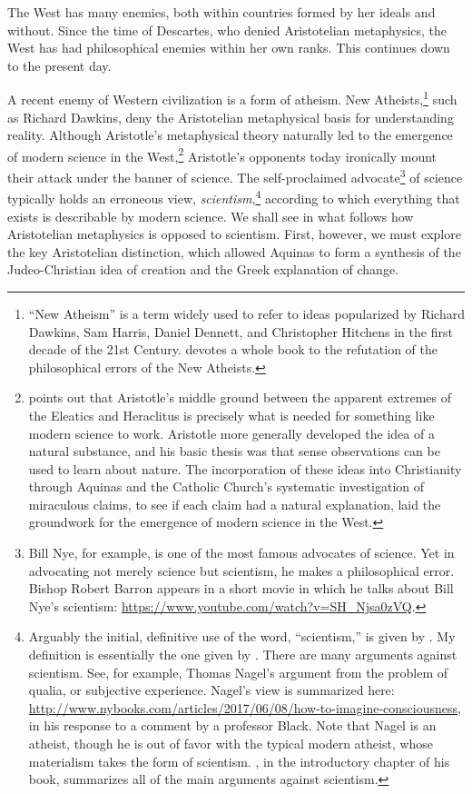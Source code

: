 \documentclass[twocolumn]{article}
\begin{document}
The West has many enemies, both within countries formed by her ideals and
without.  Since the time of Descartes, who denied Aristotelian metaphysics, the
West has had philosophical enemies within her own ranks.  This continues down
to the present day.

A recent enemy of Western civilization is a form of atheism.  New
Atheists,\footnote{%
   ``New Atheism'' is a term widely used to refer to ideas popularized by
   Richard Dawkins, Sam Harris, Daniel Dennett, and Christopher Hitchens in the
   first decade of the 21st Century.  \cite{f2008} devotes a whole book to the
   refutation of the philosophical errors of the New Atheists.
}
such as Richard Dawkins, deny the Aristotelian metaphysical basis for
understanding reality.  Although Aristotle's metaphysical theory naturally led
to the emergence of modern science in the West,\footnote{%
   \citet[Page 36]{f2014} points out that Aristotle's middle ground between the
   apparent extremes of the Eleatics and Heraclitus is precisely what is needed
   for something like modern science to work.  Aristotle more generally
   \citep[Pages 164--171]{f2014} developed the idea of a natural substance, and
   his basic thesis was that sense observations can be used to learn about
   nature.  The incorporation of these ideas into Christianity through Aquinas
   and the Catholic Church's systematic investigation of miraculous claims, to
   see if each claim had a natural explanation, laid the groundwork for the
   emergence of modern science in the West.
}
Aristotle's opponents today ironically mount their attack under the banner of
science.  The self-proclaimed advocate\footnote{%
   Bill Nye, for example, is one of the most famous advocates of science.  Yet
   in advocating not merely science but scientism, he makes a philosophical
   error.  Bishop Robert Barron appears in a short movie in which he talks
   about Bill Nye's scientism:
   \url{https://www.youtube.com/watch?v=SH_Njsa0zVQ}.%
}
of science typically holds an erroneous view, \emph{scientism},\footnote{%
   Arguably the initial, definitive use of the word, ``scientism,'' is given by
   \cite{s1991}.  My definition is essentially the one given by \cite{h2011}.
   There are many arguments against scientism.  See, for example, Thomas
   Nagel's argument from the problem of qualia, or subjective experience.
   Nagel's view is summarized here:
   \url{http://www.nybooks.com/articles/2017/06/08/how-to-imagine-consciousness},
   in his response to a comment by a professor Black.  Note that Nagel is an
   atheist, though he is out of favor with the typical modern atheist, whose
   materialism takes the form of scientism.  \cite{f2014}, in the introductory
   chapter of his book, summarizes all of the main arguments against
   scientism.%
}
according to which everything that exists is describable by modern science.  We
shall see in what follows how Aristotelian metaphysics is opposed to scientism.
First, however, we must explore the key Aristotelian distinction, which allowed
Aquinas to form a synthesis of the Judeo-Christian idea of creation and the
Greek explanation of change.
\end{document}
